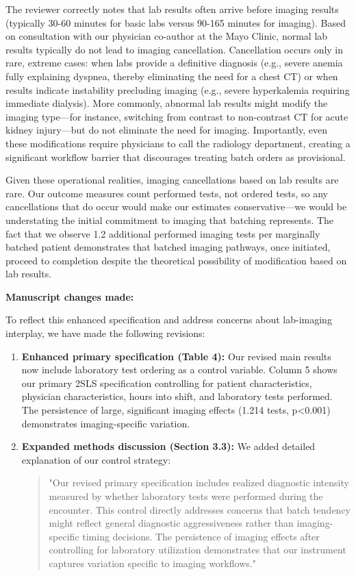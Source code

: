 \documentclass[11pt]{article}
\newcommand{\1}{\hbox{\rm 1\kern-.35em 1}}
\begin{document}
The reviewer correctly notes that lab results often arrive before imaging results (typically 30-60 minutes for basic labs versus 90-165 minutes for imaging). Based on consultation with our physician co-author at the Mayo Clinic, normal lab results typically do not lead to imaging cancellation. Cancellation occurs only in rare, extreme cases: when labs provide a definitive diagnosis (e.g., severe anemia fully explaining dyspnea, thereby eliminating the need for a chest CT) or when results indicate instability precluding imaging (e.g., severe hyperkalemia requiring immediate dialysis). More commonly, abnormal lab results might modify the imaging type—for instance, switching from contrast to non-contrast CT for acute kidney injury—but do not eliminate the need for imaging. Importantly, even these modifications require physicians to call the radiology department, creating a significant workflow barrier that discourages treating batch orders as provisional.

Given these operational realities, imaging cancellations based on lab results are rare. Our outcome measures count performed tests, not ordered tests, so any cancellations that do occur would make our estimates conservative—we would be understating the initial commitment to imaging that batching represents. The fact that we observe 1.2 additional performed imaging tests per marginally batched patient demonstrates that  batched imaging pathways, once initiated, proceed to completion despite the theoretical possibility of modification based on lab results.

\textbf{Manuscript changes made:}

To reflect this enhanced specification and address concerns about lab-imaging interplay, we have made the following revisions:

\begin{enumerate}
\item \textbf{Enhanced primary specification (Table 4):} Our revised main results now include laboratory test ordering as a control variable. Column 5 shows our primary 2SLS specification controlling for patient characteristics, physician characteristics, hours into shift, and laboratory tests performed. The persistence of large, significant imaging effects (1.214 tests, p<0.001) demonstrates imaging-specific variation.

\item \textbf{Expanded methods discussion (Section 3.3):} We added detailed explanation of our control strategy:
\begin{quote}
"Our revised primary specification includes realized diagnostic intensity measured by whether laboratory tests were performed during the encounter. This control directly addresses concerns that batch tendency might reflect general diagnostic aggressiveness rather than imaging-specific timing decisions. The persistence of imaging effects after controlling for laboratory utilization demonstrates that our instrument captures variation specific to imaging workflows."
\end{quote}
\end{enumerate}
\end{document}
